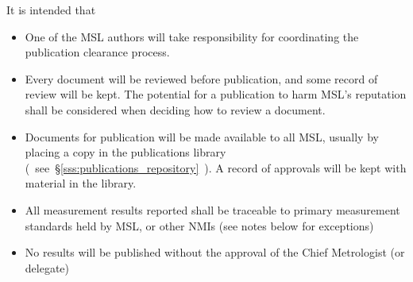 It is intended that
\begin{itemize}
\item One of the MSL authors will take responsibility for coordinating the publication clearance process. 

\item  Every document will be reviewed before publication, and some record of review will be kept. The potential for a publication to harm MSL's reputation shall be considered when deciding how to review a document. 

\item  Documents for publication will be made available to all MSL, usually by placing a copy in the publications library (~see~\S\ref{sss:publications_repository}~). A record of approvals will be kept with material in the library. 


\item  All measurement results reported shall be traceable to primary measurement standards held by MSL, or other NMIs (see notes below for exceptions)
\item  No results will be published without the approval of the Chief Metrologist (or delegate) 
\end{itemize}


